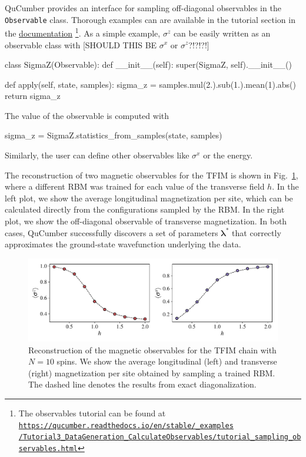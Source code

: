 \documentclass[submission, Phys, hidelnks]{SciPost}
\newcommand{\red}[1]{{\color{red} #1}}
\begin{document}
QuCumber provides an interface for sampling off-diagonal observables in the \verb|Observable| class. Thorough examples can are available in the tutorial section in the \href{https://qucumber.readthedocs.io/en/stable/}{documentation}\!\!
\footnote{The observables tutorial can be found at 
    \href{https://qucumber.readthedocs.io/en/stable/\_examples/Tutorial3\_DataGeneration\_CalculateObservables/tutorial\_sampling\_observables.html
}{\texttt{https://qucumber.readthedocs.io/en/stable/\_examples\\/Tutorial3\_DataGeneration\_CalculateObservables/tutorial\_sampling\_observables.html}}
}. 
As a simple example, $\sigma^z$ can be easily written as an observable class with
\red{[SHOULD THIS BE $\sigma^x$ or $\sigma^z$?!?!?!]}
\begin{python}
class SigmaZ(Observable):
    def __init__(self):
        super(SigmaZ, self).__init__()

    def apply(self, state, samples):
        sigma_z = samples.mul(2.).sub(1.).mean(1).abs()
        return sigma_z
\end{python}
The value of the observable is computed with 
\begin{python}
sigma_z = SigmaZ.statistics_from_samples(state, samples)
\end{python}
Similarly, the user can define other observables like $\sigma^x$ or the energy. 

The reconstruction of two magnetic observables for the TFIM is shown in Fig.~\ref{tfim_magn}, where a different RBM was trained for each value of the transverse field $h$. In the left plot, we show the average longitudinal magnetization per site, which can be calculated directly from the configurations sampled by the RBM. In the right plot, we show the off-diagonal observable of transverse magnetization. In both cases, QuCumber successfully discovers a set of parameters $\bm{\lambda}^*$ that correctly approximates the ground-state wavefunction underlying the data.

\begin{figure}[htb]
    \centering{}
    \includegraphics[width=\columnwidth]{obs.pdf}
    \caption{\label{tfim_magn} Reconstruction of the magnetic observables for the TFIM chain with $N=10$ spins. We show the average longitudinal (left) and transverse (right) magnetization per site obtained by sampling a trained RBM. The dashed line denotes the results from exact diagonalization.}
\end{figure}
\end{document}
